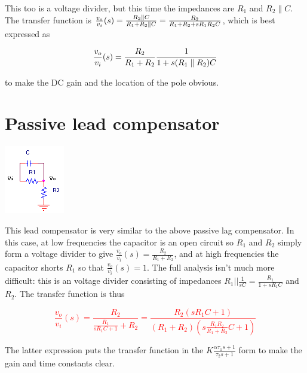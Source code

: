 This too is a voltage divider, but this time the impedances are $R_1$ and $R_2 \parallel C$.
The transfer function is $\frac{v_o}{v_i}(s) = \frac{R_2 \parallel C}{R_1 + R_2 \parallel C} = \frac{R_2}{R_1 + R_2 +sR_1 R_2 C}$, which is best expressed as

\textcolor{red}{
\begin{equation}
\frac{v_o}{v_i}(s) = \frac{R_2}{R_1 + R_2}\frac{1}{1+s(R_1 \parallel R_2)C}
\end{equation}
}

to make the DC gain and the location of the pole obvious.

\section{Passive lead compensator}
\begin{center}
	\includegraphics{schematics/passivelead.PNG}
\end{center}
This lead compensator is very similar to the above passive lag compensator. In this case, at low frequencies the capacitor is an open circuit so $R_{1}$ and $R_{2}$ simply form a voltage divider to give $\frac{v_{o}}{v_{i}}(s) = \frac{R_{2}}{R_{1}+R_{2}}$, and at high frequencies the capacitor shorts $R_{1}$ so that $\frac{v_{o}}{v_{i}}(s) = 1$. The full analysis isn't much more difficult: this is an voltage divider consisting of impedances $R_{1}||\frac{1}{sC} = \frac{R_{1}}{1+sR_{1}C}$ and $R_{2}$. The transfer function is thus

\textcolor{red}{
\begin{equation}
\frac{v_{o}}{v_{i}}(s) = \frac{R_{2}}{\frac{R_{1}}{sR_{1}C+1} + R_{2}} = \frac{R_{2}(sR_{1}C + 1)}{(R_{1} + R_{2})(s\frac{R_{1}R_{2}}{R_{1}+R_{2}}C + 1)}
\label{eq:passivelead}
\end{equation}
}

The latter expression puts the transfer function in the $K\frac{\alpha \tau_1 s+1}{\tau_2 s+1}$ form to make the gain and time constants clear. \autocite[278]{analog-design-feedback-lundberg}

